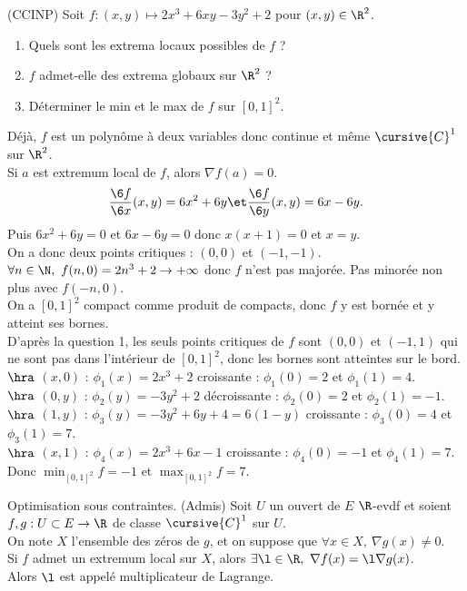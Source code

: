 \documentclass[11pt]{article}
\begin{document}
\begin{exercice}{(CCINP)}{}
    Soit $f:(x,y)\mapsto2x^3+6xy-3y^2+2$ pour $(x,y)\in\R^2$.
    \begin{enumerate}
        \item Quels sont les extrema locaux possibles de $f$ ?
        \item $f$ admet-elle des extrema globaux sur $\R^2$ ?
        \item Déterminer le min et le max de $f$ sur $[0,1]^2$.
    \end{enumerate}
    \tcblower
    Déjà, $f$ est un polynôme à deux variables donc continue et même $\cursive{C}^1$ sur $\R^2$.\\
     Si $a$ est extremum local de $f$, alors $\nabla f(a)=0$.
    \begin{equation*}
        \frac{\6 f}{\6 x}(x,y) = 6x^2 + 6y \et \frac{\6 f}{\6 y}(x,y)  = 6x - 6y.
    \end{equation*}
    Puis $6x^2+6y = 0$ et $6x - 6y = 0$ donc $x(x+1)=0$ et $x=y$.\\
    On a donc deux points critiques  : $(0,0)$ et $(-1,-1)$.\\
     $\forall n \in \N, ~ f(n, 0) = 2n^3 + 2 \to +\infty$ donc $f$ n'est pas majorée. Pas minorée non plus avec $f(-n,0)$.\\
     On a $[0,1]^2$ compact comme produit de compacts, donc $f$ y est bornée et y atteint ses bornes.\\
    D'après la question 1, les seuls points critiques de $f$ sont $(0,0)$ et $(-1,1)$ qui ne sont pas dans l'intérieur de $[0,1]^2$, donc les bornes sont atteintes sur le bord.\\
    $\hra$ $(x,0)$ : $\phi_1(x) = 2x^3+2$ croissante : $\phi_1(0)=2$ et $\phi_1(1)=4$.\\
    $\hra$ $(0, y)$ : $\phi_2(y) = -3y^2 + 2$ décroissante : $\phi_2(0)=2$ et $\phi_2(1)=-1$.\\
    $\hra$ $(1, y)$ : $\phi_3(y) = -3y^2+6y+4 = 6(1-y)$ croissante : $\phi_3(0)=4$ et $\phi_3(1)=7$.\\
    $\hra$ $(x,1)$ : $\phi_4(x)=2x^3 + 6x - 1$ croissante : $\phi_4(0)=-1$ et $\phi_4(1)=7$.\\
    Donc $\min_{[0,1]^2}f=-1$ et $\max_{[0,1]^2}f = 7$. 
\end{exercice}

\begin{prop}{Optimisation sous contraintes. (Admis)}{}
    Soit $U$ un ouvert de $E$ $\R$-evdf et soient $f,g:U\subset E\to\R$ de classe $\cursive{C}^1$ sur $U$.\\
    On note $X$ l'ensemble des zéros de $g$, et on suppose que $\forall x \in X, ~ \nabla g(x)\neq0$.\\
    Si $f$ admet un extremum local sur $X$, alors $\exists \l \in \R, ~ \nabla f(x) = \l\nabla g(x)$.\\
    Alors $\l$ est appelé multiplicateur de Lagrange.
\end{prop}
\end{document}

